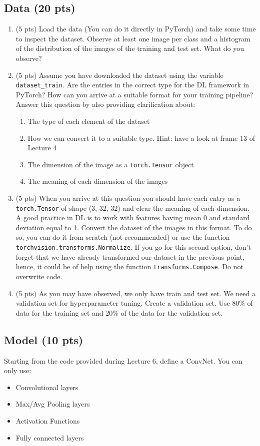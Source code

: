 \documentclass[a4paper]{article}
\begin{document}
\subsection{Data (20 pts)}
\begin{enumerate}
    \item (5 pts) Load the data (You can do it directly in PyTorch) and take some time to inspect the dataset. Observe at least one image per class and a histogram of the distribution of the images of the training and test set. What do you observe?
    \item (5 pts) Assume you have downloaded the dataset using the variable \texttt{dataset\_train}. Are the entries in the correct type for the DL framework in PyTorch? How can you arrive at a suitable format for your training pipeline? Answer this question by also providing clarification about:
    \begin{enumerate}
        \item The type of each element of the dataset
        \item How we can convert it to a suitable type. Hint: have a look at frame 13 of Lecture 4
        \item The dimension of the image as a \texttt{torch.Tensor} object
        \item The meaning of each dimension of the images
    \end{enumerate}
    \item (5 pts) When you arrive at this question you should have each entry as a \texttt{torch.Tensor} of shape (3, 32, 32) and clear the meaning of each dimension. A good practice in DL is to work with features having mean 0 and standard deviation equal to 1. Convert the dataset of the images in this format. To do so, you can do it from scratch (not recommended) or use the function \texttt{torchvision.transforms.Normalize}. If you go for this second option, don't forget that we have already transformed our dataset in the previous point, hence, it could be of help using the function \texttt{transforms.Compose}. Do not overwrite code.
    
    \item (5 pts) As you may have observed, we only have train and test set. We need a validation set for hyperparameter tuning. Create a validation set. Use 80\% of data for the training set and 20\% of the data for the validation set.
\end{enumerate}

\subsection{Model (10 pts)}
Starting from the code provided during Lecture 6, define a ConvNet. You can only use:
\begin{itemize}
    \item Convolutional layers
    \item Max/Avg Pooling layers
    \item Activation Functions
    \item Fully connected layers
\end{itemize}
\end{document}
